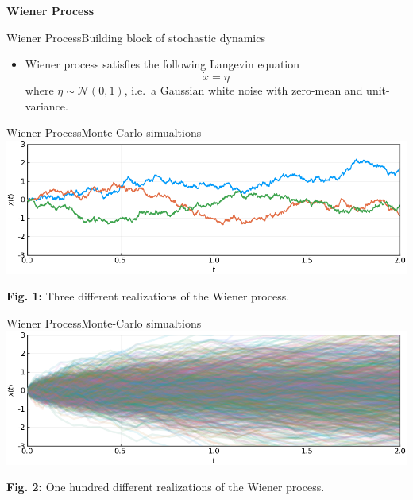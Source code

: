 \documentclass[usenames,dvipsnames,svgnames,10pt,aspectratio=169]{beamer}
\begin{document}

\begin{frame}[t, c]{}
	\centering
	\vspace{1cm}

	{\Large \textbf{Wiener Process}}

	\bigskip

	{}

\end{frame}

\begin{frame}[t, c]{Wiener Process}{Building block of stochastic dynamics}
	\begin{itemize}
		\item Wiener process satisfies the following Langevin equation
		$$
		\dot{x} = \eta
		$$
		where $\eta \sim \mathcal{N}(0, 1)$, i.e.\ a Gaussian white noise with zero-mean and unit-variance.
	\end{itemize}

	\vspace{1cm}
\end{frame}

\begin{frame}[t, c]{Wiener Process}{Monte-Carlo simualtions}
	\centering
	\includegraphics[width=.8\textwidth]{wiener_processes}

	\textbf{Fig. 1:} Three different realizations of the Wiener process.

	\vspace{1cm}
\end{frame}

\begin{frame}[t, c]{Wiener Process}{Monte-Carlo simualtions}
	\centering
	\includegraphics[width=.8\textwidth]{wiener_process_monte_carlo}

	\textbf{Fig. 2:} One hundred different realizations of the Wiener process.

	\vspace{1cm}
\end{frame}
\end{document}
